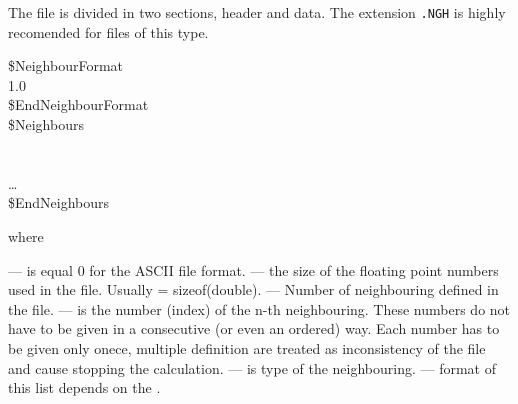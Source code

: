 The file is divided in two sections, header and data.
The extension {\tt .NGH} is highly recomended for files of this type.
\begin{fileformat}
\$NeighbourFormat\\
  1.0  \\
\$EndNeighbourFormat\\
\$Neighbours\\
  \\
    \\
  \dots\\
\$EndNeighbours\\
\end{fileformat}
where
\begin{description}
  --- is equal 0 for the ASCII file format.
  --- the size of the floating point numbers used in
  the file. Usually  = sizeof(double).
  --- Number of neighbouring defined in the
  file.
  --- is the number (index) of the n-th
  neighbouring. These numbers do not have to be given in a consecutive (or even an
  ordered) way. Each number has to be given only onece, multiple definition
  are treated as inconsistency of the file and cause stopping the
  calculation.
  --- is type of the neighbouring. 
  --- format of this list depends on the
  .
\end{description}
